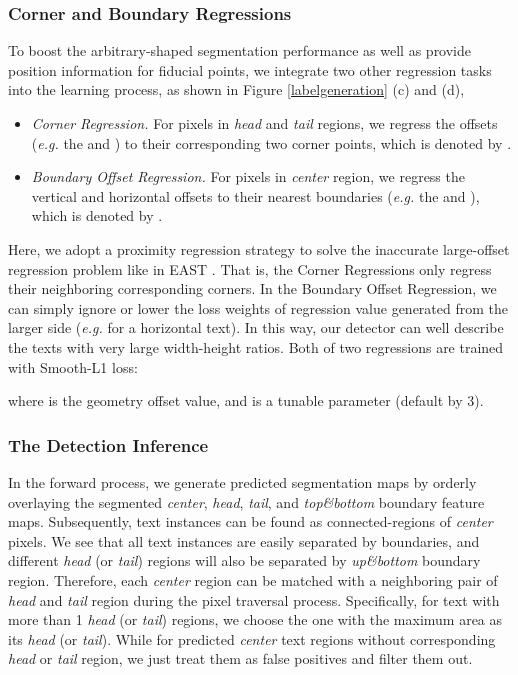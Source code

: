 \documentclass[letterpaper]{article} \usepackage{aaai20}  \usepackage{times}  \usepackage{helvet} \usepackage{courier}  \usepackage[hyphens]{url}  \usepackage{graphicx} \urlstyle{rm} \def\UrlFont{\rm}  \usepackage{graphicx}  \frenchspacing  \setlength{\pdfpagewidth}{8.5in}  \setlength{\pdfpageheight}{11in}  \usepackage{amsmath}
\begin{document}
\subsubsection{Corner and Boundary Regressions}
To boost the arbitrary-shaped segmentation performance as well as provide position information for fiducial points, we integrate two other regression tasks into the learning process, as shown in Figure \ref{labelgeneration} (c) and (d),
\begin{itemize}
\item \emph{Corner Regression.}
For pixels in \emph{head} and \emph{tail} regions, we regress the offsets (\emph{e.g.} the  and ) to their corresponding two corner points, which is denoted by .

\item \emph{Boundary Offset Regression.}
For pixels in \emph{center} region, we regress the vertical and horizontal offsets to their nearest boundaries (\emph{e.g.} the  and ), which is denoted by .
\end{itemize}
Here, we adopt a proximity regression strategy to solve the inaccurate large-offset regression problem like in EAST \cite{zhou2017east}.
That is, the Corner Regressions only regress their neighboring corresponding corners.
In the Boundary Offset Regression, we can simply ignore or lower the loss weights of regression value generated from the larger side (\emph{e.g.}  for a horizontal text). In this way, our detector can well describe the texts with very large width-height ratios.
Both of two regressions are trained with Smooth-L1 loss:

where  is the geometry offset value, and  is a tunable parameter (default by 3).

\subsubsection{The Detection Inference}
In the forward process, we generate predicted segmentation maps by orderly overlaying the segmented \emph{center}, \emph{head}, \emph{tail}, and \emph{top\&bottom} boundary feature maps.
Subsequently, text instances can be found as connected-regions of \emph{center} pixels.
We see that all text instances are easily separated by boundaries, and different \emph{head} (or \emph{tail}) regions will also be separated by \emph{up\&bottom} boundary region. Therefore, each \emph{center} region can be matched with a neighboring pair of \emph{head} and \emph{tail} region during the pixel traversal process.
Specifically, for text with more than 1 \emph{head} (or \emph{tail}) regions, we choose the one with the maximum area as its \emph{head} (or \emph{tail}).
While for predicted \emph{center} text regions without corresponding \emph{head} or \emph{tail} region, we just treat them as false positives and filter them out.
\end{document}
